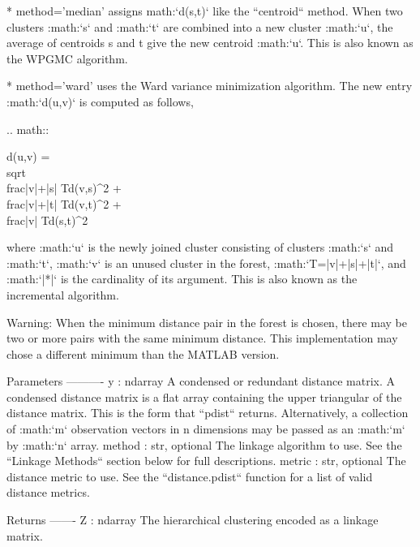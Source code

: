\begin{DoxyVerb}
  * method='median' assigns math:`d(s,t)` like the ``centroid``
    method. When two clusters :math:`s` and :math:`t` are combined
    into a new cluster :math:`u`, the average of centroids s and t
    give the new centroid :math:`u`. This is also known as the
    WPGMC algorithm.

  * method='ward' uses the Ward variance minimization algorithm.
    The new entry :math:`d(u,v)` is computed as follows,

    .. math::

       d(u,v) = \\sqrt{\\frac{|v|+|s|}
                           {T}d(v,s)^2
                    + \\frac{|v|+|t|}
                           {T}d(v,t)^2
                    + \\frac{|v|}
                           {T}d(s,t)^2}

    where :math:`u` is the newly joined cluster consisting of
    clusters :math:`s` and :math:`t`, :math:`v` is an unused
    cluster in the forest, :math:`T=|v|+|s|+|t|`, and
    :math:`|*|` is the cardinality of its argument. This is also
    known as the incremental algorithm.

Warning: When the minimum distance pair in the forest is chosen, there
may be two or more pairs with the same minimum distance. This
implementation may chose a different minimum than the MATLAB
version.

Parameters
----------
y : ndarray
    A condensed or redundant distance matrix. A condensed distance matrix
    is a flat array containing the upper triangular of the distance matrix.
    This is the form that ``pdist`` returns. Alternatively, a collection of
    :math:`m` observation vectors in n dimensions may be passed as an
    :math:`m` by :math:`n` array.
method : str, optional
    The linkage algorithm to use. See the ``Linkage Methods`` section below
    for full descriptions.
metric : str, optional
    The distance metric to use. See the ``distance.pdist`` function for a
    list of valid distance metrics.

Returns
-------
Z : ndarray
    The hierarchical clustering encoded as a linkage matrix.\end{DoxyVerb}
 \hypertarget{namespacescipy_1_1cluster_1_1hierarchy_a94a7225fdc03418ef902fa333dcab176}{}
